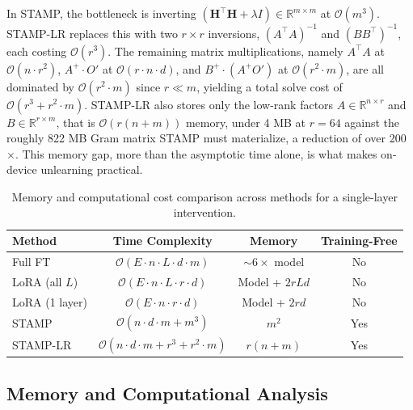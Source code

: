 In STAMP, the bottleneck is inverting $(\mathbf{H}^\top \mathbf{H} + \lambda I) \in \mathbb{R}^{m \times m}$ at $\mathcal{O}(m^3)$. STAMP-LR replaces this with two $r \times r$ inversions, $(A^\top A)^{-1}$ and $(BB^\top)^{-1}$, each costing $\mathcal{O}(r^3)$. The remaining matrix multiplications, namely $A^\top A$ at $\mathcal{O}(n \cdot r^2)$, $A^+ \cdot O'$ at $\mathcal{O}(r \cdot n \cdot d)$, and $B^+ \cdot (A^+ O')$ at $\mathcal{O}(r^2 \cdot m)$, are all dominated by $\mathcal{O}(r^2 \cdot m)$ since $r \ll m$, yielding a total solve cost of $\mathcal{O}(r^3 + r^2 \cdot m)$. STAMP-LR also stores only the low-rank factors $A \in \mathbb{R}^{n \times r}$ and $B \in \mathbb{R}^{r \times m}$, that is $\mathcal{O}(r(n+m))$ memory, under 4 MB at $r = 64$ against the roughly 822 MB Gram matrix STAMP must materialize, a reduction of over 200$\times$. This memory gap, more than the asymptotic time alone, is what makes on-device unlearning practical.

\begin{table}[!htbp]
\centering
\caption{Memory and computational cost comparison across methods for a single-layer intervention.}
\label{tab:cost_comparison}
\small
\renewcommand{\arraystretch}{1.3}
\setlength{\tabcolsep}{6pt}
\begin{tabular}{lccc}
\toprule
\textbf{Method} & \textbf{Time Complexity} & \textbf{Memory} & \textbf{Training-Free} \\
\midrule
Full FT & $\mathcal{O}(E \cdot n \cdot L \cdot d \cdot m)$ & ${\sim}6\times$ model & No \\
\rowcolor{gray!15}
LoRA (all $L$) & $\mathcal{O}(E \cdot n \cdot L \cdot r \cdot d)$ & Model + $2rLd$ & No \\
LoRA (1 layer) & $\mathcal{O}(E \cdot n \cdot r \cdot d)$ & Model + $2rd$ & No \\
\rowcolor{gray!15}
STAMP & $\mathcal{O}(n \cdot d \cdot m + m^3)$ & $m^2$ & Yes \\
STAMP-LR & $\mathcal{O}(n \cdot d \cdot m + r^3 + r^2 \cdot m)$ & $r(n+m)$ & Yes \\
\bottomrule
\end{tabular}
\end{table}

\subsection{Memory and Computational Analysis}\label{subsec:rp_compute}

